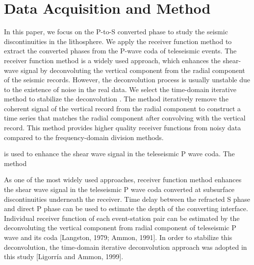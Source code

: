 \section{Data Acquisition and Method}

In this paper, we focus on the P-to-S converted phase to study the seismic discontinuities in the lithosphere. We apply the receiver function method \cite[e.g.][]{Langston_1979,ammon1991isolation} to extract the converted phases from the P-wave coda of teleseismic events. The receiver function method is a widely used approach, which enhances the shear-wave signal by deconvoluting the vertical component from the radial component of the seismic records. However, the deconvolution process is usually unstable due to the existence of noise in the real data. We select the time-domain iterative method to stabilize the deconvolution \cite{ligorria1999iterative}. The method iteratively remove the coherent signal of the vertical record from the radial component to construct a time series that matches the radial component after convolving with the vertical record. This method provides higher quality receiver functions from noisy data compared to the frequency-domain division methods.

is used to enhance the shear wave signal in the teleseismic P wave coda. The method 



As one of the most widely used approaches, receiver function method enhances the shear wave signal in the teleseismic P wave coda converted at subsurface discontinuities underneath the receiver. Time delay between the refracted S phase and direct P phase can be used to estimate the depth of the converting interface. 
Individual receiver function of each event-station pair can be estimated by the deconvoluting the vertical component from radial component of teleseismic P wave and its coda [Langston, 1979; Ammon, 1991]. In order to stabilize this deconvolution, the time-domain iterative deconvolution approach was adopted in this study [Ligorría and Ammon, 1999].

